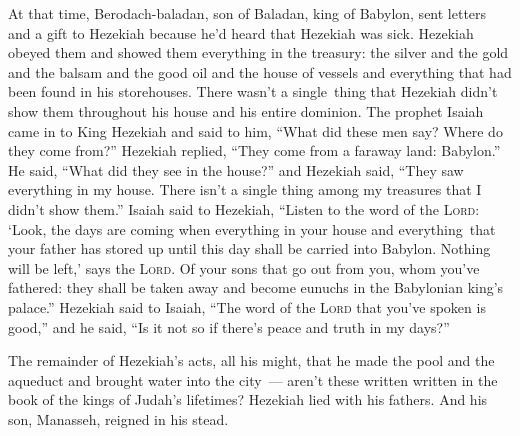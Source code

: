 \begin{inparaenum}
     At that time, Berodach-baladan, son of Baladan, king of Babylon, sent letters and a gift to Hezekiah because he'd heard that Hezekiah was sick.%
     Hezekiah obeyed them and showed them everything in the treasury: the silver and the gold and the balsam and the good oil and the house of vessels and everything that had been found in his storehouses. There wasn't a single\understood\ thing that Hezekiah didn't show them throughout his house and his entire dominion.%
     The prophet Isaiah came in to King Hezekiah and said to him, ``What did these men say? Where do they come from?'' Hezekiah replied, ``They come from a faraway land: Babylon.''%
     He said, ``What did they see in the house?'' and Hezekiah said, ``They saw everything in my house. There isn't a single thing among my treasures that I didn't show them.''%
     Isaiah said to Hezekiah, ``Listen to the word of the \textsc{Lord}:%
     `Look, the days are coming when everything in your house and everything\understood\ that your father has stored up until this day shall be carried into Babylon. Nothing will be left,' says the \textsc{Lord}.%
     Of your sons that go out from you, whom you've fathered: they shall be taken away and become eunuchs in the Babylonian king's palace.''%
     Hezekiah said to Isaiah, ``The word of the \textsc{Lord} that you've spoken is good,'' and he said, ``Is it not so if there's peace and truth in my days?''%
    
     The remainder of Hezekiah's acts, all his might, that he made the pool and the aqueduct and brought water into the city~--- aren't these written written in the book of the kings of Judah's lifetimes?%
     Hezekiah lied with his fathers. And his son, Manasseh, reigned in his stead.%
\end{inparaenum}
